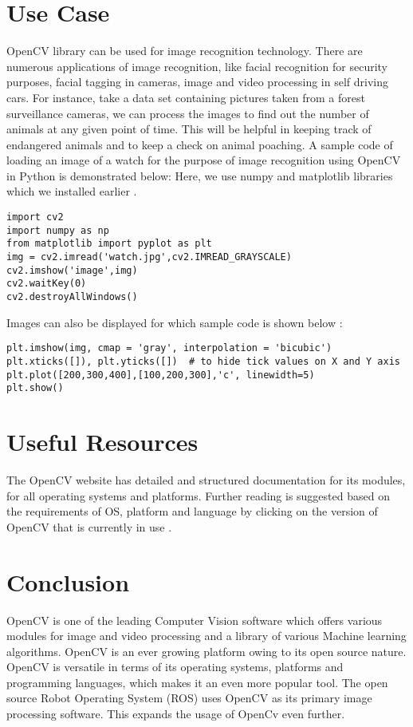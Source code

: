 \documentclass[9pt,twocolumn,twoside]{../../styles/osajnl}
\begin{document}
\section{Use Case}
OpenCV library can be used for image recognition technology. There are numerous applications of image recognition, like facial recognition for security purposes, facial tagging in cameras, image and video processing in self driving cars. For instance, take a data set containing pictures taken from a forest surveillance cameras, we can process the images to find out the number of animals at any given point of time. This will be helpful in keeping track of endangered animals and to keep a check on animal poaching. 
\newline A sample code of loading an image of a watch for the purpose of image recognition using OpenCV in Python is demonstrated below:
\newline Here, we use numpy and matplotlib libraries which we installed earlier \cite{www-opencv-pythonprgm-tut}.
\begin{Verbatim}
import cv2
import numpy as np
from matplotlib import pyplot as plt
img = cv2.imread('watch.jpg',cv2.IMREAD_GRAYSCALE)
cv2.imshow('image',img)
cv2.waitKey(0)
cv2.destroyAllWindows()
\end{Verbatim}
Images can also be displayed for which sample code is shown below \cite{www-opencv-pythonprgm-tut}:
\begin{Verbatim}
plt.imshow(img, cmap = 'gray', interpolation = 'bicubic')
plt.xticks([]), plt.yticks([])  # to hide tick values on X and Y axis
plt.plot([200,300,400],[100,200,300],'c', linewidth=5)
plt.show()
\end{Verbatim}
\section{Useful Resources}
The OpenCV website has detailed and structured documentation for its modules, for all operating systems and platforms. Further reading is suggested based on the requirements of OS, platform and language by clicking on the version of OpenCV that is currently in use \cite{www-opencv-docs}. 

\section{Conclusion}
OpenCV is one of the leading Computer Vision software which offers various modules for image and video processing and a library of various Machine learning algorithms. OpenCV is an ever growing platform owing to its open source nature. OpenCV is versatile in terms of its operating systems, platforms and programming languages, which makes it an even more popular tool. The open source Robot Operating System (ROS) uses OpenCV as its primary image processing software. This expands the usage of OpenCv even further. 
\end{document}
